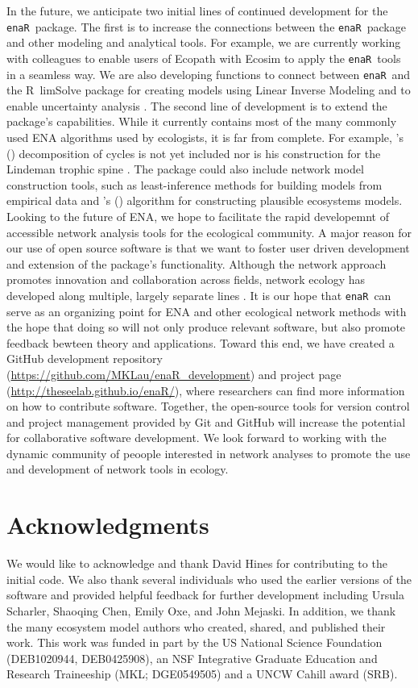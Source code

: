 \documentclass[11pt]{article}
\def\citeapos#1{\citeauthor{#1}'s (\citeyear{#1})}
\newcommand{\R}{R}
\newcommand{\enaR}{\texttt{enaR}}
\begin{document}
\begin{spacing}{2}
In the future, we anticipate two initial lines of continued
development for the \enaR\ package. The first is to increase the
connections between the \enaR\ package and other modeling and
analytical tools.  For example, we are currently working with
colleagues to enable users of Ecopath with Ecosim
\citep{christensen04} to apply the \enaR\ tools in a seamless way.  We
are also developing functions to connect between \enaR\ and the
\R\ limSolve package \citep{soetaert09} for creating models using
Linear Inverse Modeling and to enable uncertainty analysis
\citep{kones09}. The second line of development is to extend the
package's capabilities.  While it currently contains most of the many
commonly used ENA algorithms used by ecologists, it is far from
complete. For example, \citeapos{ulanowicz83} decomposition of cycles
is not yet included nor is his construction for the Lindeman trophic
spine \citep{ulanowicz1979trophic}. The package could also include
network model construction tools, such as least-inference methods for
building models from empirical data \citep{ulanowicz2008least} and
\citeapos{fath04_cyber} algorithm for constructing plausible
ecosystems models.
%
Looking to the future of ENA, we hope to facilitate the rapid
developemnt of accessible network analysis tools for the ecological
community. A major reason for our use of open source software is that
we want to foster user driven development and extension of the
package's functionality. Although the network approach promotes
innovation and collaboration across fields, network ecology has
developed along multiple, largely separate lines
\citep{scharler09comparing}.  It is our hope that
\enaR\ can serve as an organizing point for ENA and other ecological
network methods with the hope that doing so will not only produce
relevant software, but also promote feedback bewteen theory and
applications. Toward this end, we have created a GitHub development
repository (\url{https://github.com/MKLau/enaR_development}) and
project page (\url{http://theseelab.github.io/enaR/}), where
researchers can find more information on how to contribute
software. Together, the open-source tools for version control and
project management provided by Git and GitHub will increase the
potential for collaborative software development. We look forward to
working with the dynamic community of peoople interested in network
analyses to promote the use and development of network tools in
ecology.

\section{Acknowledgments}
We would like to acknowledge and thank David Hines for contributing to
the initial code.  We also thank several individuals who used the
earlier versions of the software and provided helpful feedback for
further development including Ursula Scharler, Shaoqing Chen, Emily
Oxe, and John Mejaski.  In addition, we thank the many ecosystem model
authors who created, shared, and published their work.  This work was
funded in part by the US National Science Foundation (DEB1020944,
DEB0425908), an NSF Integrative Graduate Education and Research
Traineeship (MKL; DGE0549505) and a UNCW Cahill award (SRB).


\end{spacing}
\end{document}
